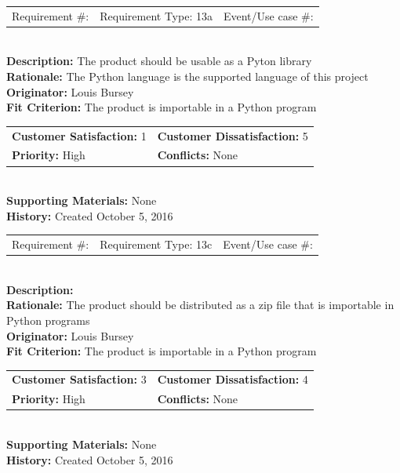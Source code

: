 \documentclass[12pt, titlepage]{article}
\begin{document}
%
%
\begin{reqbox}
\begin{tabular}{ccc}
Requirement \#: & Requirement Type: 13a & Event/Use case \#: \\
\end{tabular} \\
\textbf{Description:} The product should be usable as a Pyton library \\
\textbf{Rationale:} The Python language is the supported language of this project\\
\textbf{Originator:} Louis Bursey\\
\textbf{Fit Criterion:}  The product is importable in a Python program\\
\begin{tabular}{ll}
\textbf{Customer Satisfaction:} 1 & \textbf{Customer Dissatisfaction:} 5 \\
\textbf{Priority:} High & \textbf{Conflicts:} None\\
\end{tabular} \\
\textbf{Supporting Materials:} None \\
\textbf{History:} Created October 5, 2016
\end{reqbox}
%
%
%
%
%
\begin{reqbox}
\begin{tabular}{ccc}
Requirement \#: & Requirement Type: 13c & Event/Use case \#: \\
\end{tabular} \\
\textbf{Description:} \\
\textbf{Rationale:} The product should be distributed as a zip file that is importable in Python programs\\
\textbf{Originator:} Louis Bursey\\
\textbf{Fit Criterion:}  The product is importable in a Python program\\
\begin{tabular}{ll}
\textbf{Customer Satisfaction:} 3 & \textbf{Customer Dissatisfaction:} 4 \\
\textbf{Priority:} High & \textbf{Conflicts:} None\\
\end{tabular} \\
\textbf{Supporting Materials:} None \\
\textbf{History:} Created October 5, 2016
\end{reqbox}
\end{document}
